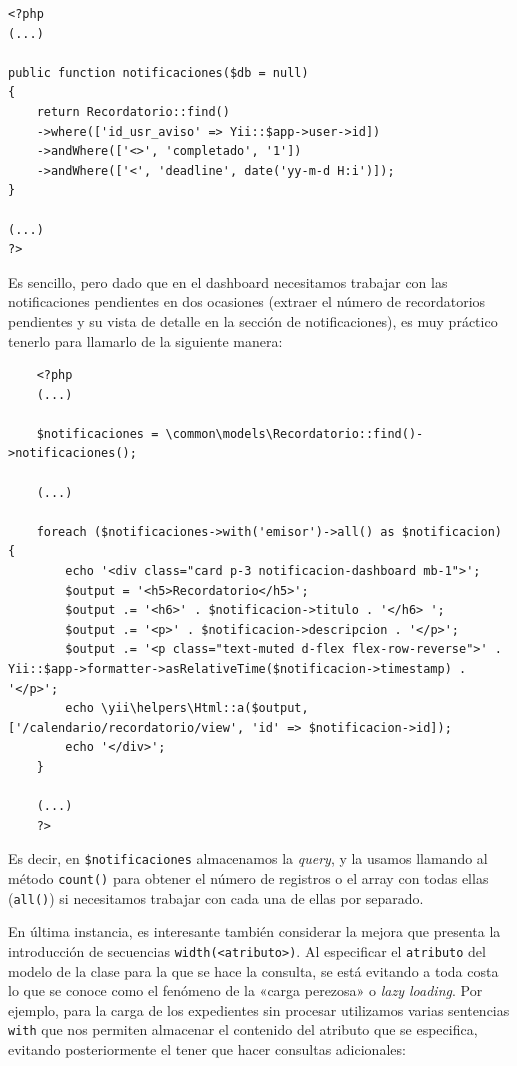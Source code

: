 \begin{verbatim}
<?php
(...)

public function notificaciones($db = null)
{
	return Recordatorio::find()
	->where(['id_usr_aviso' => Yii::$app->user->id])
	->andWhere(['<>', 'completado', '1'])
	->andWhere(['<', 'deadline', date('yy-m-d H:i')]);
}

(...)
?>
\end{verbatim}

Es sencillo, pero dado que en el dashboard necesitamos trabajar con las notificaciones pendientes en dos ocasiones (extraer el número de recordatorios pendientes y su vista de detalle en la sección de notificaciones), es muy práctico tenerlo para llamarlo de la siguiente manera:

\begin{verbatim}
	<?php
	(...)
	
	$notificaciones = \common\models\Recordatorio::find()->notificaciones();
	
	(...)
	
	foreach ($notificaciones->with('emisor')->all() as $notificacion) {
		echo '<div class="card p-3 notificacion-dashboard mb-1">';
		$output = '<h5>Recordatorio</h5>';
		$output .= '<h6>' . $notificacion->titulo . '</h6> ';
		$output .= '<p>' . $notificacion->descripcion . '</p>';
		$output .= '<p class="text-muted d-flex flex-row-reverse">' . Yii::$app->formatter->asRelativeTime($notificacion->timestamp) . '</p>';
		echo \yii\helpers\Html::a($output, ['/calendario/recordatorio/view', 'id' => $notificacion->id]);
		echo '</div>';
	}
	
	(...)
	?>
\end{verbatim}

Es decir, en \texttt{\$notificaciones} almacenamos la \textit{query}, y la usamos llamando al método \texttt{count()} para obtener el número de registros o el array con todas ellas (\texttt{all()}) si necesitamos trabajar con cada una de ellas por separado.

En última instancia, es interesante también considerar la mejora que presenta la introducción de secuencias \texttt{width(<atributo>)}. Al especificar el \texttt{atributo} del modelo de la clase para la que se hace la consulta, se está evitando a toda costa lo que se conoce como el fenómeno de la «carga perezosa» o \textit{lazy loading}. Por ejemplo, para la carga de los expedientes sin procesar utilizamos varias sentencias \texttt{with} que nos permiten almacenar el contenido del atributo que se especifica, evitando posteriormente el tener que hacer consultas adicionales:

